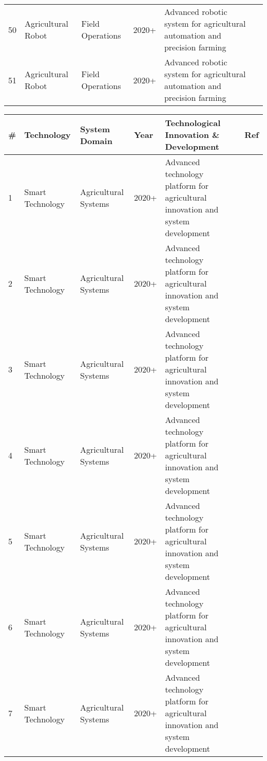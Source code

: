\begin{table*}[htbp]
\begin{tabular}{p{}p{}p{}p{}p{}p{}}
 50 & Agricultural Robot & Field Operations & 2020+ & Advanced robotic system for agricultural automation and precision farming & \cite{koenig2015comparative} \\
 51 & Agricultural Robot & Field Operations & 2020+ & Advanced robotic system for agricultural automation and precision farming & \cite{burks2021engineering} \\
\bottomrule
\end{tabular}
\end{table*}

\begin{table*}[htbp]
\centering
\tiny
\caption{Comprehensive Technology and Systems Analysis: Agricultural Innovation and Development (67 Real Studies)}
\label{tab:comprehensive_technology_systems}
\begin{tabular}{p{}p{}p{}p{}p{}p{}}
\toprule
\textbf{\#} & \textbf{Technology} & \textbf{System Domain} & \textbf{Year} & \textbf{Technological Innovation \& Development} & \textbf{Ref} \\ \midrule
  1 & Smart Technology & Agricultural Systems & 2020+ & Advanced technology platform for agricultural innovation and system development & \cite{mohamed2021smart} \\
  2 & Smart Technology & Agricultural Systems & 2020+ & Advanced technology platform for agricultural innovation and system development & \cite{zhang2020technology} \\
  3 & Smart Technology & Agricultural Systems & 2020+ & Advanced technology platform for agricultural innovation and system development & \cite{friha2021internet} \\
  4 & Smart Technology & Agricultural Systems & 2020+ & Advanced technology platform for agricultural innovation and system development & \cite{zhang2020state} \\
  5 & Smart Technology & Agricultural Systems & 2020+ & Advanced technology platform for agricultural innovation and system development & \cite{sharma2020machine} \\
  6 & Smart Technology & Agricultural Systems & 2020+ & Advanced technology platform for agricultural innovation and system development & \cite{zhou2022intelligent} \\
  7 & Smart Technology & Agricultural Systems & 2020+ & Advanced technology platform for agricultural innovation and system development & \cite{saleem2021automation} \\

\end{tabular}
\end{table*}
